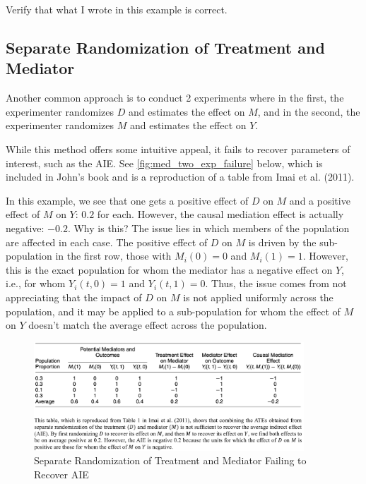\documentclass[10pt]{article}
\begin{document}
\begin{questions}
    Verify that what I wrote in this example is correct.
\end{questions}


\subsection{Separate Randomization of Treatment and Mediator}

Another common approach is to conduct 2 experiments where in the first, the 
experimenter
randomizes $D$ and estimates the effect on $M$, and in the second, 
the experimenter randomizes $M$ and estimates the effect on $Y$.

While this method offers some intuitive appeal, it fails to recover 
parameters of interest, such as the AIE.
See \autoref{fig:med_two_exp_failure} below,
which is included in John's book and is a 
reproduction of a table from Imai et al. (2011).

In this example, we 
see that one gets a positive effect of $D$ on $M$ and a positive effect of $M$ on $Y$:
$0.2$ for each. However, the causal mediation effect 
is actually negative: $-0.2$. Why is this? 
The issue lies in which members of the population 
are affected in each case. The positive effect of 
$D$ on $M$ is driven by the sub-population in the first row, those 
with $M_i(0) = 0$ and $M_i(1) = 1$. However, this is the exact 
population for whom the mediator has a negative effect on $Y$, i.e., for whom 
$Y_i(t,0) = 1$ and
$Y_i(t,1) = 0$. Thus, the issue comes from not appreciating 
that the impact of $D$ on $M$ is not applied uniformly across 
the population, and it may be applied to a sub-population 
for whom the effect of $M$ on $Y$ doesn't match the average effect 
across the population. 


\begin{figure}[!htb]
    \centering
        \includegraphics[width=0.9\textwidth]{../input/med_two_exp_failure.png}
    \caption{Separate Randomization of Treatment and Mediator Failing to Recover AIE}
    \label{fig:med_two_exp_failure}
\end{figure}
\end{document}
